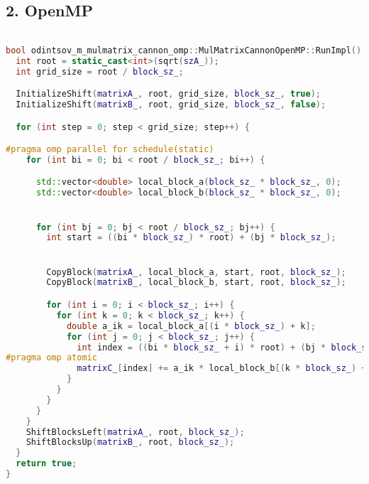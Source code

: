 \documentclass[12pt]{article}
\begin{document}
\subsection*{2. OpenMP}
\begin{lstlisting}[language=C++,  breaklines=true]

bool odintsov_m_mulmatrix_cannon_omp::MulMatrixCannonOpenMP::RunImpl() {
  int root = static_cast<int>(sqrt(szA_));
  int grid_size = root / block_sz_;

  InitializeShift(matrixA_, root, grid_size, block_sz_, true);
  InitializeShift(matrixB_, root, grid_size, block_sz_, false);

  for (int step = 0; step < grid_size; step++) {

#pragma omp parallel for schedule(static)
    for (int bi = 0; bi < root / block_sz_; bi++) {

      std::vector<double> local_block_a(block_sz_ * block_sz_, 0);
      std::vector<double> local_block_b(block_sz_ * block_sz_, 0);


      for (int bj = 0; bj < root / block_sz_; bj++) {
        int start = ((bi * block_sz_) * root) + (bj * block_sz_);


        CopyBlock(matrixA_, local_block_a, start, root, block_sz_);
        CopyBlock(matrixB_, local_block_b, start, root, block_sz_);

        for (int i = 0; i < block_sz_; i++) {
          for (int k = 0; k < block_sz_; k++) {
            double a_ik = local_block_a[(i * block_sz_) + k];
            for (int j = 0; j < block_sz_; j++) {
              int index = ((bi * block_sz_ + i) * root) + (bj * block_sz_ + j);
#pragma omp atomic
              matrixC_[index] += a_ik * local_block_b[(k * block_sz_) + j];
            }
          }
        }
      }
    }
    ShiftBlocksLeft(matrixA_, root, block_sz_);
    ShiftBlocksUp(matrixB_, root, block_sz_);
  }
  return true;
}
\end{lstlisting}
\end{document}
